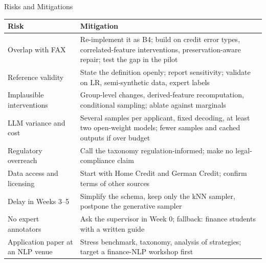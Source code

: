 \documentclass[aspectratio=169,10pt]{beamer}
\begin{document}
\begin{frame}{Risks and Mitigations}
  \scriptsize
  \renewcommand{\arraystretch}{1.25}
  \begin{tabularx}{\textwidth}{@{}L{3.1cm} Y@{}}
    \textbf{\color{vrblue}Risk} & \textbf{\color{vrblue}Mitigation}\\\hline
    Overlap with FAX & Re-implement it as B4; build on credit error types, correlated-feature interventions, preservation-aware repair; test the gap in the pilot\\
    Reference validity & State the definition openly; report sensitivity; validate on LR, semi-synthetic data, expert labels\\
    Implausible interventions & Group-level changes, derived-feature recomputation, conditional sampling; ablate against marginals\\
    LLM variance and cost & Several samples per applicant, fixed decoding, at least two open-weight models; fewer samples and cached outputs if over budget\\
    Regulatory overreach & Call the taxonomy regulation-informed; make no legal-compliance claim\\
    Data access and licensing & Start with Home Credit and German Credit; confirm terms of other sources\\
    Delay in Weeks 3--5 & Simplify the schema, keep only the kNN sampler, postpone the generative sampler\\
    No expert annotators & Ask the supervisor in Week 0; fallback: finance students with a written guide\\
    Application paper at an NLP venue & Stress benchmark, taxonomy, analysis of strategies; target a finance-NLP workshop first
  \end{tabularx}
\end{frame}
\end{document}

